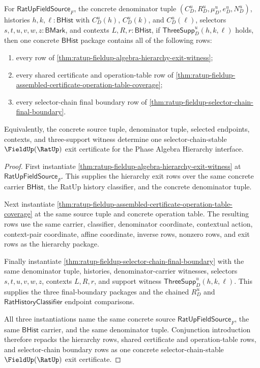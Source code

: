 \begin{theorem}
\label{thm:ratup-fieldup-algebra-hierarchy-selector-chain-exit}
For $\mathsf{RatUpFieldSource}_F$, the concrete denominator tuple
$(C_D^u,R_D^u,\mu_D^u,e_D^u,N_D^u)$, histories
$h,k,\ell:\mathsf{BHist}$ with $C_D^u(h)$, $C_D^u(k)$, and $C_D^u(\ell)$,
selectors $s,t,u,v,w,z:\mathsf{BMark}$, and contexts
$L,R,r:\mathsf{BHist}$, if $\mathsf{ThreeSupp}_D^u(h,k,\ell)$ holds, then one
concrete $\mathsf{BHist}$ package contains all of the following rows:
\begin{enumerate}
  \item every row of
  \autoref{thm:ratup-fieldup-algebra-hierarchy-exit-witness};
  \item every shared certificate and operation-table row of
  \autoref{thm:ratup-fieldup-assembled-certificate-operation-table-coverage};
  \item every selector-chain final boundary row of
  \autoref{thm:ratup-fieldup-selector-chain-final-boundary}.
\end{enumerate}
Equivalently, the concrete source tuple, denominator tuple, selected endpoints,
contexts, and three-support witness determine one selector-chain-stable
$\FieldUp(\RatUp)$ exit certificate for the Phase Algebra Hierarchy interface.
\end{theorem}
\begin{proof}
First instantiate
\autoref{thm:ratup-fieldup-algebra-hierarchy-exit-witness} at
$\mathsf{RatUpFieldSource}_F$. This supplies the hierarchy exit rows over the
same concrete carrier $\mathsf{BHist}$, the RatUp history classifier, and the
concrete denominator tuple.

Next instantiate
\autoref{thm:ratup-fieldup-assembled-certificate-operation-table-coverage} at
the same source tuple and concrete operation table. The resulting rows use the
same carrier, classifier, denominator coordinate, contextual action,
context-pair coordinate, affine coordinate, inverse rows, nonzero rows, and
exit rows as the hierarchy package.

Finally instantiate
\autoref{thm:ratup-fieldup-selector-chain-final-boundary} with the same
denominator tuple, histories, denominator-carrier witnesses, selectors
$s,t,u,v,w,z$, contexts $L,R,r$, and support witness
$\mathsf{ThreeSupp}_D^u(h,k,\ell)$. This supplies the three final-boundary
packages and the chained $R_D^u$ and $\mathsf{RatHistoryClassifier}$ endpoint
comparisons.

All three instantiations name the same concrete source
$\mathsf{RatUpFieldSource}_F$, the same $\mathsf{BHist}$ carrier, and the same
denominator tuple. Conjunction introduction therefore repacks the hierarchy
rows, shared certificate and operation-table rows, and selector-chain boundary
rows as one concrete selector-chain-stable $\FieldUp(\RatUp)$ exit certificate.
\end{proof}

